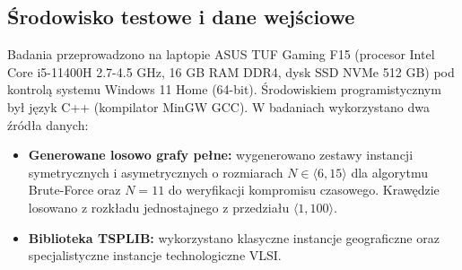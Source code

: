 \documentclass[conference]{IEEEtran}
\begin{document}
        \subsection{Środowisko testowe i dane wejściowe}
            Badania przeprowadzono na laptopie ASUS TUF Gaming F15 (procesor Intel Core i5-11400H 2.7-4.5 GHz, 16 GB RAM DDR4, dysk SSD NVMe 512 GB) pod kontrolą systemu Windows 11 Home (64-bit). Środowiskiem programistycznym był język C++ (kompilator MinGW GCC). 
            W badaniach wykorzystano dwa źródła danych:
            \begin{itemize}
                \item \textbf{Generowane losowo grafy pełne:} wygenerowano zestawy instancji symetrycznych i asymetrycznych o rozmiarach $N \in \langle 6, 15 \rangle$ dla algorytmu Brute-Force oraz $N=11$ do weryfikacji kompromisu czasowego. Krawędzie losowano z rozkładu jednostajnego z przedziału $\langle 1, 100 \rangle$.
                \item \textbf{Biblioteka TSPLIB:} wykorzystano klasyczne instancje geograficzne oraz specjalistyczne instancje technologiczne VLSI.
            \end{itemize}
\end{document}
